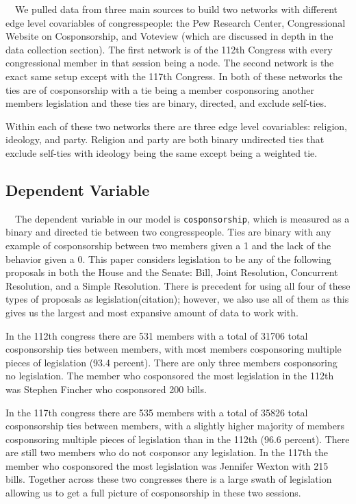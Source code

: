 \documentclass[Royal,times,sageh]{sagej}
\begin{document}
\doublespacing

~~We pulled data from three main sources to build two networks with different edge level covariables of congresspeople: the Pew Research Center, Congressional Website on Cosponsorship, and Voteview (which are discussed in depth in the data collection section). The first network is of the 112th Congress with every congressional member in that session being a node. The second network is the exact same setup except with the 117th Congress. In both of these networks the ties are of cosponsorship with a tie being a member cosponsoring another members legislation and these ties are binary, directed, and exclude self-ties.

Within each of these two networks there are three edge level covariables: religion, ideology, and party. Religion and party are both binary undirected ties that exclude self-ties with ideology being the same except being a weighted tie.

\hypertarget{dependent-variable}{%
\subsection{Dependent Variable}\label{dependent-variable}}

\doublespacing

~~The dependent variable in our model is \texttt{cosponsorship}, which is measured as a binary and directed tie between two congresspeople. Ties are binary with any example of cosponsorship between two members given a 1 and the lack of the behavior given a 0. This paper considers legislation to be any of the following proposals in both the House and the Senate: Bill, Joint Resolution, Concurrent Resolution, and a Simple Resolution. There is precedent for using all four of these types of proposals as legislation(citation); however, we also use all of them as this gives us the largest and most expansive amount of data to work with.

In the 112th congress there are 531 members with a total of 31706 total cosponsorship ties between members, with most members cosponsoring multiple pieces of legislation (93.4 percent). There are only three members cosponsoring no legislation. The member who cosponsored the most legislation in the 112th was Stephen Fincher who cosponsored 200 bills.

In the 117th congress there are 535 members with a total of 35826 total cosponsorship ties between members, with a slightly higher majority of members cosponsoring multiple pieces of legislation than in the 112th (96.6 percent). There are still two members who do not cosponsor any legislation. In the 117th the member who cosponsored the most legislation was Jennifer Wexton with 215 bills.
Together across these two congresses there is a large swath of legislation allowing us to get a full picture of cosponsorship in these two sessions.
\end{document}
